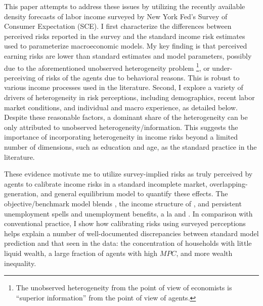 
This paper attempts to address these issues by utilizing the recently available density forecasts of labor income surveyed by New York Fed's Survey of Consumer Expectation (SCE). I first characterize the differences between perceived risks reported in the survey and the standard income risk estimates used to parameterize macroeconomic models. My key finding is that perceived earning risks are lower than standard estimates and model parameters, possibly due to the aforementioned unobserved heterogeneity problem \footnote{The unobserved heterogeneity from the point of view of economists is ``superior information'' from the point of view of agents.}, or under-perceiving of risks of the agents due to behavioral reasons. This is robust to various income processes used in the literature.
Second, I explore a variety of drivers of heterogeneity in risk perceptions, including demographics, recent labor market conditions, and individual and macro experience, as detailed below. Despite these reasonable factors, a dominant share of the heterogeneity can be only attributed to unobserved heterogeneity/information. This suggests the importance of incorporating heterogeneity in income risks beyond a limited number of dimensions, such as education and age, as the standard practice in the literature. 

These evidence motivate me to utilize survey-implied risks as truly perceived by agents to calibrate income risks in a standard incomplete market, overlapping-generation, and general equilibrium model to quantify these effects. The objective/benchmark model blends \cite{huggett1996wealth}, the income structure of \cite{carroll1997nature}, and persistent unemployment spells and unemployment benefits, a la \cite{krueger2016macroeconomics} and \cite{carroll2017distribution}. In comparison with conventional practice, I show how calibrating risks using surveyed perceptions helps explain a number of well-documented discrepancies between standard model prediction and that seen in the data: the concentration of households with little liquid wealth, a large fraction of agents with high $MPC$, and more wealth inequality. 


